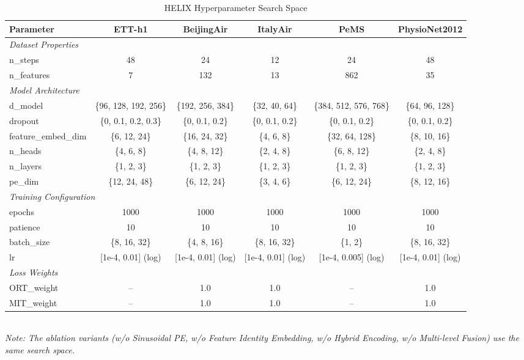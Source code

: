 \begin{table}[H]
\centering
\caption{HELIX Hyperparameter Search Space}
\label{tab:hyperparam_helix}
\begin{adjustbox}{max width=\textwidth}
\begin{small}
\begin{tabular}{l|ccccc}
\toprule
\textbf{Parameter} & \textbf{ETT-h1} & \textbf{BeijingAir} & \textbf{ItalyAir} & \textbf{PeMS} & \textbf{PhysioNet2012} \\
\midrule
\multicolumn{6}{l}{\textit{Dataset Properties}} \\
n\_steps & 48 & 24 & 12 & 24 & 48 \\
n\_features & 7 & 132 & 13 & 862 & 35 \\
\midrule
\multicolumn{6}{l}{\textit{Model Architecture}} \\
d\_model & \{96, 128, 192, 256\} & \{192, 256, 384\} & \{32, 40, 64\} & \{384, 512, 576, 768\} & \{64, 96, 128\} \\
dropout & \{0, 0.1, 0.2, 0.3\} & \{0, 0.1, 0.2\} & \{0, 0.1, 0.2\} & \{0, 0.1, 0.2\} & \{0, 0.1, 0.2\} \\
feature\_embed\_dim & \{6, 12, 24\} & \{16, 24, 32\} & \{4, 6, 8\} & \{32, 64, 128\} & \{8, 10, 16\} \\
n\_heads & \{4, 6, 8\} & \{4, 8, 12\} & \{2, 4, 8\} & \{6, 8, 12\} & \{2, 4, 8\} \\
n\_layers & \{1, 2, 3\} & \{1, 2, 3\} & \{1, 2, 3\} & \{1, 2, 3\} & \{1, 2, 3\} \\
pe\_dim & \{12, 24, 48\} & \{6, 12, 24\} & \{3, 4, 6\} & \{6, 12, 24\} & \{8, 12, 16\} \\
\midrule
\multicolumn{6}{l}{\textit{Training Configuration}} \\
epochs & 1000 & 1000 & 1000 & 1000 & 1000 \\
patience & 10 & 10 & 10 & 10 & 10 \\
batch\_size & \{8, 16, 32\} & \{4, 8, 16\} & \{8, 16, 32\} & \{1, 2\} & \{8, 16, 32\} \\
lr & [1e-4, 0.01] (log) & [1e-4, 0.01] (log) & [1e-4, 0.01] (log) & [1e-4, 0.005] (log) & [1e-4, 0.01] (log) \\
\midrule
\multicolumn{6}{l}{\textit{Loss Weights}} \\
ORT\_weight & -- & 1.0 & 1.0 & -- & 1.0 \\
MIT\_weight & -- & 1.0 & 1.0 & -- & 1.0 \\
\bottomrule
\end{tabular}
\end{small}
\end{adjustbox}
\\[2pt]
\footnotesize{\textit{Note: The ablation variants (w/o Sinusoidal PE, w/o Feature Identity Embedding, w/o Hybrid Encoding, w/o Multi-level Fusion) use the same search space.}}
\end{table}